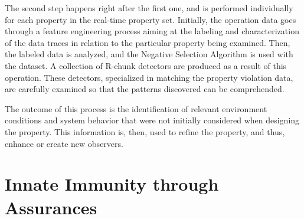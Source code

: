 The second step happens right after the first one, and is performed individually for each property in the real-time property set. Initially, the operation data goes through a feature engineering process aiming at the labeling and characterization of the data traces in relation to the particular property being examined. Then, the labeled data is analyzed, and the Negative Selection Algorithm is used with the dataset. A collection of R-chunk detectors are produced as a result of this operation. These detectors, specialized in matching the property violation data, are carefully examined so that the patterns discovered can be comprehended. 

The outcome of this process is the identification of relevant environment conditions and system behavior that were not initially considered when designing the property. This information is, then, used to refine the property, and thus, enhance or create new observers.


\section{Innate Immunity through Assurances}







